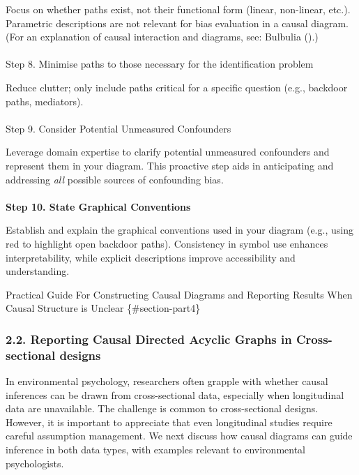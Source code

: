 \documentclass[
  single column]{article}
\makeatletter
\let\oldparagraph\paragraph
\renewcommand{\paragraph}{
    \@ifstar
      \xxxParagraphStar
      \xxxParagraphNoStar
  }
\newcommand{\xxxParagraphStar}[1]{\oldparagraph*{#1}\mbox{}}
\newcommand{\xxxParagraphNoStar}[1]{\oldparagraph{#1}\mbox{}}
\makeatother
\begin{document}
Focus on whether paths exist, not their functional form (linear,
non-linear, etc.). Parametric descriptions are not relevant for bias
evaluation in a causal diagram. (For an explanation of causal
interaction and diagrams, see: Bulbulia
().)

\paragraph{Step 8. Minimise paths to those necessary for the
identification
problem}\label{step-8.-minimise-paths-to-those-necessary-for-the-identification-problem}

Reduce clutter; only include paths critical for a specific question
(e.g., backdoor paths, mediators).

\paragraph{Step 9. Consider Potential Unmeasured
Confounders}\label{step-9.-consider-potential-unmeasured-confounders}

Leverage domain expertise to clarify potential unmeasured confounders
and represent them in your diagram. This proactive step aids in
anticipating and addressing \emph{all} possible sources of confounding
bias.

\paragraph{\texorpdfstring{\textbf{Step 10. State Graphical
Conventions}}{Step 10. State Graphical Conventions}}\label{step-10.-state-graphical-conventions}

Establish and explain the graphical conventions used in your diagram
(e.g., using red to highlight open backdoor paths). Consistency in
symbol use enhances interpretability, while explicit descriptions
improve accessibility and understanding.

Practical Guide For Constructing Causal Diagrams and Reporting Results
When Causal Structure is Unclear \{\#section-part4\}

\subsubsection{2.2. Reporting Causal Directed Acyclic Graphs in
Cross-sectional
designs}\label{reporting-causal-directed-acyclic-graphs-in-cross-sectional-designs}

In environmental psychology, researchers often grapple with whether
causal inferences can be drawn from cross-sectional data, especially
when longitudinal data are unavailable. The challenge is common to
cross-sectional designs. However, it is important to appreciate that
even longitudinal studies require careful assumption management. We next
discuss how causal diagrams can guide inference in both data types, with
examples relevant to environmental psychologists.
\end{document}
